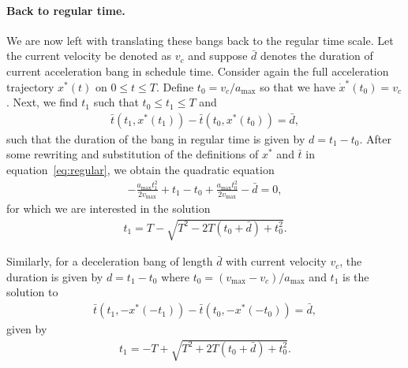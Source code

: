 \documentclass[a4paper]{article}
\theoremstyle{definition}
\theoremstyle{plain}
\begin{document}
\paragraph{Back to regular time.}
We are now left with translating these bangs back to the regular time scale. Let
the current velocity be denoted as $v_{c}$ and suppose $\bar{d}$ denotes the
duration of current acceleration bang in schedule time. Consider again the
full acceleration trajectory $x^{*}(t)$ on $0 \leq t \leq T$. Define
$t_{0}= v_{c} / a_{\max}$ so that we have $\dot{x}^{*}(t_{0}) = v_{c}$. Next, we
find $t_{1}$ such that $t_{0} \leq t_{1} \leq T$ and
\begin{align}
  \label{eq:regular}
   \bar{t}(t_{1}, x^{*}(t_{1})) - \bar{t}(t_{0}, x^{*}(t_{0})) = \bar{d} ,
\end{align}
such that the duration of the bang in regular time is given by $d = t_{1} - t_{0}$.
%
After some rewriting and substitution of the definitions of $x^{*}$ and
$\bar{t}$ in equation~\eqref{eq:regular}, we obtain the quadratic equation
\begin{align*}
  - \frac{a_{\max} t_{1}^{2}}{2 v_{\max}} + t_{1} - t_{0} + \frac{a_{\max} t_{0}^{2}}{2 v_{\max}} - \bar{d} = 0 ,
\end{align*}
for which we are interested in the solution
\begin{align*}
  t_{1} = T - \sqrt{T^{2} - 2T(t_{0} + \bar{d}) +t_{0}^{2}} .
\end{align*}

Similarly, for a deceleration bang of length $\bar{d}$ with current velocity
$v_{c}$, the duration is given by $d = t_{1} - t_{0}$ where
$t_{0} = (v_{\max} - v_{c}) / a_{\max}$ and $t_{1}$ is the solution to
\begin{align*}
  \bar{t}(t_{1}, -x^{*}(-t_{1})) - \bar{t}(t_{0}, -x^{*}(-t_{0})) = \bar{d} ,
\end{align*}
given by
\begin{align*}
  t_{1} = - T + \sqrt{T^{2} +2T(t_{0} + \bar{d}) + t_{0}^{2}} .
\end{align*}
\end{document}
